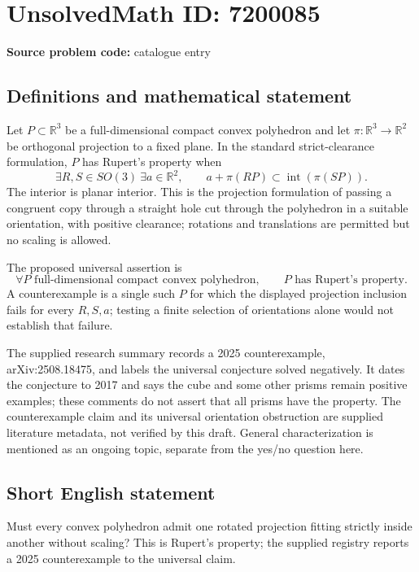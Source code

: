 \documentclass[11pt]{article}
\newcommand{\R}{\mathbb{R}}
\begin{document}
\section*{UnsolvedMath ID: 7200085}
\textbf{Source problem code:} catalogue entry
\subsection{Definitions and mathematical statement}
Let \(P\subset\R^3\) be a full-dimensional compact convex polyhedron and let \(\pi:\R^3\to\R^2\) be orthogonal projection to a fixed plane. In the standard strict-clearance formulation, \(P\) has Rupert's property when
\[
\exists R,S\in SO(3)\ \exists a\in\R^2,\qquad
 a+\pi(RP)\subset\operatorname{int}(\pi(SP)).
\]
The interior is planar interior. This is the projection formulation of passing a congruent copy through a straight hole cut through the polyhedron in a suitable orientation, with positive clearance; rotations and translations are permitted but no scaling is allowed.

The proposed universal assertion is
\[
\forall P\text{ full-dimensional compact convex polyhedron},
\qquad P\text{ has Rupert's property}.
\]
A counterexample is a single such \(P\) for which the displayed projection inclusion fails for every \(R,S,a\); testing a finite selection of orientations alone would not establish that failure.

The supplied research summary records a 2025 counterexample, arXiv:2508.18475, and labels the universal conjecture solved negatively. It dates the conjecture to 2017 and says the cube and some other prisms remain positive examples; these comments do not assert that all prisms have the property. The counterexample claim and its universal orientation obstruction are supplied literature metadata, not verified by this draft. General characterization is mentioned as an ongoing topic, separate from the yes/no question here.
\subsection{Short English statement}
Must every convex polyhedron admit one rotated projection fitting strictly inside another without scaling? This is Rupert's property; the supplied registry reports a 2025 counterexample to the universal claim.
\end{document}
